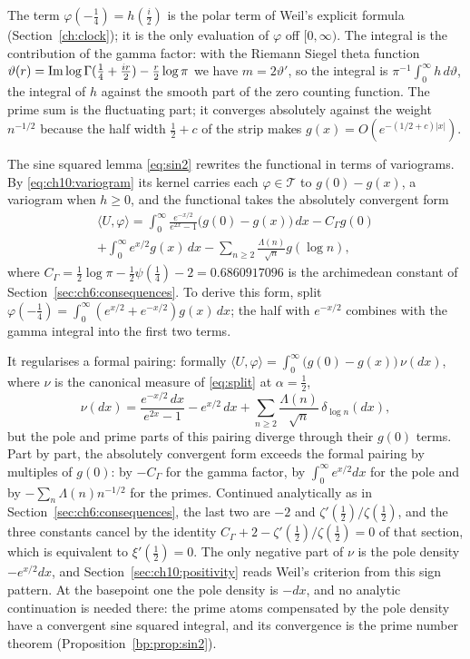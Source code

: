 The term $\varphi(-\frac14)=h(\frac i2)$ is the polar term of Weil's explicit formula (Section~\ref{ch:clock}); it is the only evaluation of $\varphi$ off $[0,\infty)$. The integral is the contribution of the gamma factor: with the Riemann Siegel theta function $\vartheta(r)=\operatorname{Im}\log\Gamma(\frac14+\frac{ir}2)-\frac r2\log\pi$ we have $m=2\vartheta'$, so the integral is $\pi^{-1}\int_0^\infty h\,d\vartheta$, the integral of $h$ against the smooth part of the zero counting function. The prime sum is the fluctuating part; it converges absolutely against the weight $n^{-1/2}$ because the half width $\frac12+c$ of the strip makes $g(x)=O(e^{-(1/2+c)|x|})$.

The sine squared lemma \eqref{eq:sin2} rewrites the functional in terms of variograms. By \eqref{eq:ch10:variogram} its kernel carries each $\varphi\in\mathcal T$ to $g(0)-g(x)$, a variogram when $h\ge0$, and the functional takes the absolutely convergent form \cite[Proposition 9.2]{P17}
\begin{multline*}
\langle U,\varphi\rangle=\int_0^\infty\frac{e^{-x/2}}{e^{2x}-1}\big(g(0)-g(x)\big)\,dx-C_\Gamma g(0)\\
+\int_0^\infty e^{x/2}g(x)\,dx-\sum_{n\ge2}\frac{\Lambda(n)}{\sqrt n}g(\log n),
\end{multline*}
where $C_\Gamma=\frac12\log\pi-\frac12\psi(\frac14)-2=0.6860917096$ is the archimedean constant of Section~\ref{sec:ch6:consequences}. To derive this form, split $\varphi(-\frac14)=\int_0^\infty(e^{x/2}+e^{-x/2})g(x)\,dx$; the half with $e^{-x/2}$ combines with the gamma integral into the first two terms.

It regularises a formal pairing: formally $\langle U,\varphi\rangle=\int_0^\infty\big(g(0)-g(x)\big)\,\nu(dx)$, where $\nu$ is the canonical measure of \eqref{eq:split} at $\alpha=\frac12$,
\[
\nu(dx)=\frac{e^{-x/2}\,dx}{e^{2x}-1}-e^{x/2}\,dx+\sum_{n\ge2}\frac{\Lambda(n)}{\sqrt n}\,\delta_{\log n}(dx),
\]
but the pole and prime parts of this pairing diverge through their $g(0)$ terms. Part by part, the absolutely convergent form exceeds the formal pairing by multiples of $g(0)$: by $-C_\Gamma$ for the gamma factor, by $\int_0^\infty e^{x/2}dx$ for the pole and by $-\sum_n\Lambda(n)n^{-1/2}$ for the primes. Continued analytically as in Section~\ref{sec:ch6:consequences}, the last two are $-2$ and $\zeta'(\frac12)/\zeta(\frac12)$, and the three constants cancel by the identity $C_\Gamma+2-\zeta'(\frac12)/\zeta(\frac12)=0$ of that section, which is equivalent to $\xi'(\frac12)=0$. The only negative part of $\nu$ is the pole density $-e^{x/2}dx$, and Section~\ref{sec:ch10:positivity} reads Weil's criterion from this sign pattern. At the basepoint one the pole density is $-dx$, and no analytic continuation is needed there: the prime atoms compensated by the pole density have a convergent sine squared integral, and its convergence is the prime number theorem (Proposition~\ref{bp:prop:sin2}).

